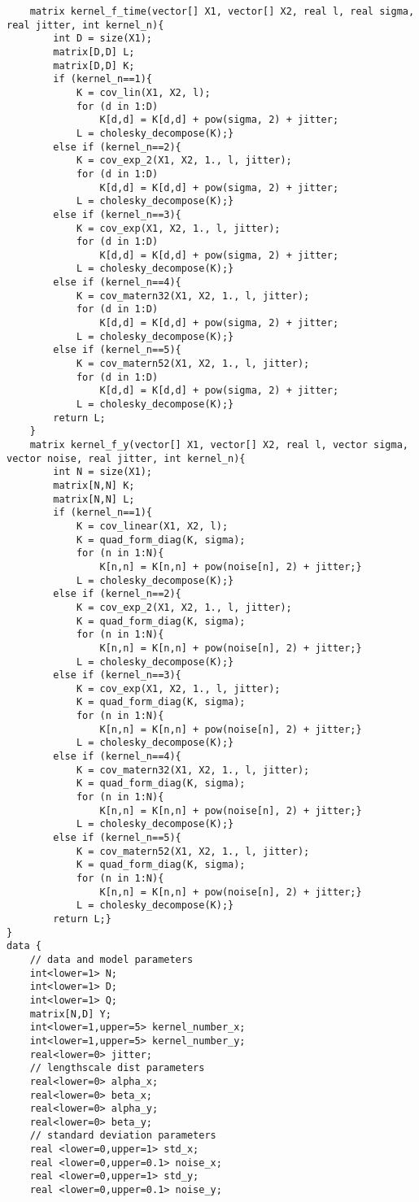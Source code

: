 \begin{lstlisting}
	matrix kernel_f_time(vector[] X1, vector[] X2, real l, real sigma, real jitter, int kernel_n){
		int D = size(X1);
		matrix[D,D] L;
		matrix[D,D] K;
		if (kernel_n==1){
			K = cov_lin(X1, X2, l);
			for (d in 1:D)
				K[d,d] = K[d,d] + pow(sigma, 2) + jitter;
			L = cholesky_decompose(K);}
		else if (kernel_n==2){
			K = cov_exp_2(X1, X2, 1., l, jitter);
			for (d in 1:D)
				K[d,d] = K[d,d] + pow(sigma, 2) + jitter;
			L = cholesky_decompose(K);}
		else if (kernel_n==3){
			K = cov_exp(X1, X2, 1., l, jitter);
			for (d in 1:D)
				K[d,d] = K[d,d] + pow(sigma, 2) + jitter;
			L = cholesky_decompose(K);}
		else if (kernel_n==4){
			K = cov_matern32(X1, X2, 1., l, jitter);
			for (d in 1:D)
				K[d,d] = K[d,d] + pow(sigma, 2) + jitter;
			L = cholesky_decompose(K);} 
		else if (kernel_n==5){
			K = cov_matern52(X1, X2, 1., l, jitter);
			for (d in 1:D)
				K[d,d] = K[d,d] + pow(sigma, 2) + jitter;
			L = cholesky_decompose(K);}
		return L;
	}
	matrix kernel_f_y(vector[] X1, vector[] X2, real l, vector sigma, vector noise, real jitter, int kernel_n){
		int N = size(X1);
		matrix[N,N] K;
		matrix[N,N] L;
		if (kernel_n==1){
			K = cov_linear(X1, X2, l);
			K = quad_form_diag(K, sigma);
			for (n in 1:N){
				K[n,n] = K[n,n] + pow(noise[n], 2) + jitter;}
			L = cholesky_decompose(K);}
		else if (kernel_n==2){
			K = cov_exp_2(X1, X2, 1., l, jitter);
			K = quad_form_diag(K, sigma);
			for (n in 1:N){
				K[n,n] = K[n,n] + pow(noise[n], 2) + jitter;}
			L = cholesky_decompose(K);}
		else if (kernel_n==3){
			K = cov_exp(X1, X2, 1., l, jitter);
			K = quad_form_diag(K, sigma);
			for (n in 1:N){
				K[n,n] = K[n,n] + pow(noise[n], 2) + jitter;}
			L = cholesky_decompose(K);}
		else if (kernel_n==4){
			K = cov_matern32(X1, X2, 1., l, jitter);
			K = quad_form_diag(K, sigma);
			for (n in 1:N){
				K[n,n] = K[n,n] + pow(noise[n], 2) + jitter;}
			L = cholesky_decompose(K);} 
		else if (kernel_n==5){
			K = cov_matern52(X1, X2, 1., l, jitter);
			K = quad_form_diag(K, sigma);
			for (n in 1:N){
				K[n,n] = K[n,n] + pow(noise[n], 2) + jitter;}
			L = cholesky_decompose(K);}
		return L;}	
}
data {
	// data and model parameters
	int<lower=1> N;
	int<lower=1> D;
	int<lower=1> Q;
	matrix[N,D] Y;
	int<lower=1,upper=5> kernel_number_x;
	int<lower=1,upper=5> kernel_number_y;
	real<lower=0> jitter;
	// lengthscale dist parameters
	real<lower=0> alpha_x;
	real<lower=0> beta_x;
	real<lower=0> alpha_y;
	real<lower=0> beta_y;
	// standard deviation parameters
	real <lower=0,upper=1> std_x;
	real <lower=0,upper=0.1> noise_x;
	real <lower=0,upper=1> std_y;
	real <lower=0,upper=0.1> noise_y;

\end{lstlisting}
